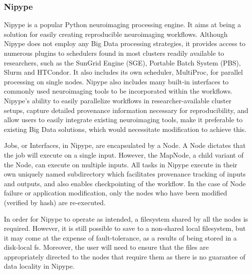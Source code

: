 \documentclass{IEEEtran}
\newcommand{\todo}[1]{\marginpar{\parbox{18mm}{\flushleft\tiny\color{red}\textbf{TODO}:
      #1}}}
\begin{document}

\subsubsection{Nipype}

Nipype is a popular Python neuroimaging processing engine. It aims at being a 
solution for easily creating reproducible neuroimaging workflows. Although Nipype
does not employ any Big Data processing strategies, it provides access to numerous
plugins to schedulers found in most clusters readily available to researchers, 
such as the SunGrid Engine (SGE), Portable Batch System (PBS), Slurm and HTCondor\todo{cite}. It also includes its own scheduler, MultiProc,
for parallel processing on single nodes. Nipype also includes many built-in 
interfaces to commonly used neuroimaging tools to be incorporated within the 
workflows. Nipype's ability to easily parallelize workflows in researcher-available 
cluster setups, capture detailed provenance information necessary for reproducibility,
and allow users to easily integrate existing neuroimaging tools, make it preferable
to existing Big Data solutions, which would necessitate modification to achieve this.

Jobs, or Interfaces, in Nipype, are encapsulated by a Node. A Node dictates that
the job will execute on a single input. However, the MapNode, 
a child variant of the Node, can execute on multiple inputs. All tasks in
Nipype execute in their own uniquely named subdirectory which facilitates provenance 
tracking of inputs and outputs, and also enables checkpointing of the workflow.
In the case of Node failure or application modification, only the nodes who have
been modified (verified by hash) are re-executed.

In order for Nipype to operate as intended, a filesystem shared by all the nodes 
is required. However, it is still possible to save to a non-shared local filesystem, 
but it may come at the expense of fault-tolerance, as a results of being stored in a disk-local fs. Moreover, the user will need to
ensure that the files are appropriately directed to the nodes that require them as
there is no guarantee of data locality in Nipype.
\end{document}
